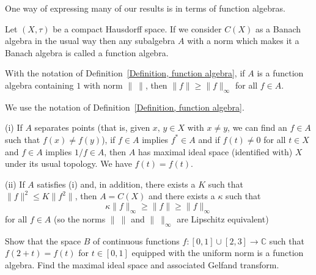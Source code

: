 One way of expressing many of our results is in
terms of function algebras.
\begin{definition}\label{Definition, function algebra}
Let $(X,\tau)$ be a compact Hausdorff
space. If we consider $C(X)$ as a Banach algebra
in the usual way then any subalgebra $A$ with
a norm which makes it a Banach algebra is
called a function algebra.
\end{definition}
\begin{lemma} With the notation of 
Definition~\ref{Definition, function algebra},
if $A$ is a function algebra containing $1$
with norm $\|\ \|$,
then $\|f\|\geq\|f\|_{\infty}$ for all $f\in A$.
\end{lemma}
\begin{lemma} We use the notation of 
Definition~\ref{Definition, function algebra}.

(i) If
$A$ separates points (that is, given $x,\, y\in X$
with $x\neq y$, we can find an $f\in A$ such that
$f(x)\neq f(y)$),
if $f\in A$ implies $f^{*}\in A$ and
if $f(t)\neq 0$ for all $t\in X$ and $f\in A$ implies $1/f\in A$,
then
$A$ has maximal ideal space
(identified with) $X$ under its usual topology.
We have $\hat{f}(t)=f(t)$.

(ii) If $A$ satisfies (i) and, in addition,
there exists a $K$ such that
$\|f\|^{2}\leq K\|f^{2}\|$, then
$A=C(X)$ and there exists a $\kappa$ such that
\[\kappa \|f\|_{\infty}\geq\|f\|\geq\|f\|_{\infty}\]
for all $f\in A$ 
(so the norms $\|\ \|$ and $\|\ \|_{\infty}$
are Lipschitz equivalent)
\end{lemma}
\begin{exercise} Show that the space $B$
of continuous functions $f:[0,1]\cup[2,3]\rightarrow{\mathbb C}$
such that $f(2+t)=f(t)$ for $t\in[0,1]$ equipped with the
uniform norm
is a function algebra.
Find the maximal ideal
space and associated Gelfand transform.
\end{exercise}

